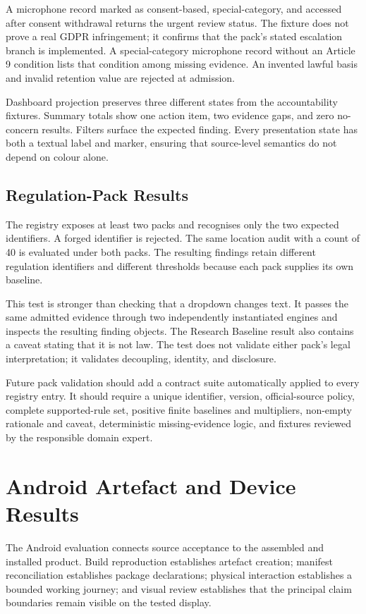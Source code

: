 A microphone record marked as consent-based, special-category, and accessed after consent withdrawal returns the urgent review status. The fixture does not prove a real GDPR infringement; it confirms that the pack's stated escalation branch is implemented. A special-category microphone record without an Article 9 condition lists that condition among missing evidence. An invented lawful basis and invalid retention value are rejected at admission.

Dashboard projection preserves three different states from the accountability fixtures. Summary totals show one action item, two evidence gaps, and zero no-concern results. Filters surface the expected finding. Every presentation state has both a textual label and marker, ensuring that source-level semantics do not depend on colour alone.

\subsection{Regulation-Pack Results}

The registry exposes at least two packs and recognises only the two expected identifiers. A forged identifier is rejected. The same location audit with a count of 40 is evaluated under both packs. The resulting findings retain different regulation identifiers and different thresholds because each pack supplies its own baseline.

This test is stronger than checking that a dropdown changes text. It passes the same admitted evidence through two independently instantiated engines and inspects the resulting finding objects. The Research Baseline result also contains a caveat stating that it is not law. The test does not validate either pack's legal interpretation; it validates decoupling, identity, and disclosure.

Future pack validation should add a contract suite automatically applied to every registry entry. It should require a unique identifier, version, official-source policy, complete supported-rule set, positive finite baselines and multipliers, non-empty rationale and caveat, deterministic missing-evidence logic, and fixtures reviewed by the responsible domain expert.

\section{Android Artefact and Device Results}

The Android evaluation connects source acceptance to the assembled and installed product. Build reproduction establishes artefact creation; manifest reconciliation establishes package declarations; physical interaction establishes a bounded working journey; and visual review establishes that the principal claim boundaries remain visible on the tested display.


